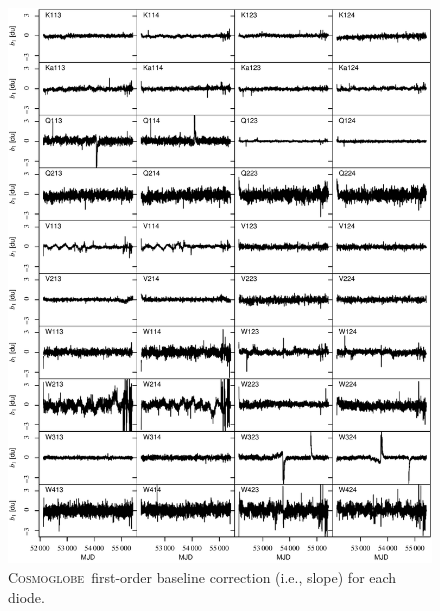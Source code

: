 \documentclass[twocolumn]{../../common/aa}
\newcommand{\cosmoglobe}{\textsc{Cosmoglobe}}
\begin{document}

\begin{figure}[p]
	\centering
	\includegraphics[width=\textwidth]{figures/instpar_CG_baseslope_v1.pdf}
	\caption{\cosmoglobe\ first-order baseline correction (i.e., slope) for each diode.}
	\label{fig:baseslope}
\end{figure}
\end{document}
